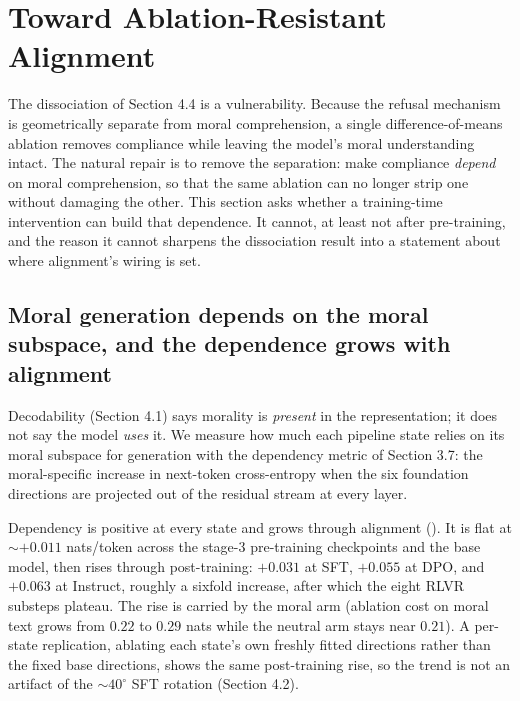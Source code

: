 \section{Toward Ablation-Resistant Alignment}\label{toward-ablation-resistant-alignment}

The dissociation of Section 4.4 is a vulnerability. Because the refusal
mechanism is geometrically separate from moral comprehension, a single
difference-of-means ablation removes compliance while leaving the model's moral
understanding intact. The natural repair is to remove the separation: make
compliance \emph{depend} on moral comprehension, so that the same ablation can no
longer strip one without damaging the other. This section asks whether a
training-time intervention can build that dependence. It cannot, at least not
after pre-training, and the reason it cannot sharpens the dissociation result
into a statement about where alignment's wiring is set.

\subsection{Moral generation depends on the moral subspace, and the dependence grows with alignment}\label{moral-generation-depends-on-the-moral-subspace-and-the-dependence-grows-with-alignment}

Decodability (Section 4.1) says morality is \emph{present} in the representation; it
does not say the model \emph{uses} it. We measure how much each pipeline state relies
on its moral subspace for generation with the dependency metric of Section 3.7:
the moral-specific increase in next-token cross-entropy when the six foundation
directions are projected out of the residual stream at every layer.

Dependency is positive at every state and grows through alignment
(). It is flat at \({\sim}{+}0.011\) nats/token across the stage-3
pre-training checkpoints and the base model, then rises through post-training:
\(+0.031\) at SFT, \(+0.055\) at DPO, and \(+0.063\) at Instruct, roughly a sixfold
increase, after which the eight RLVR substeps plateau. The rise is carried by
the moral arm (ablation cost on moral text grows from \(0.22\) to \(0.29\) nats
while the neutral arm stays near \(0.21\)). A per-state replication, ablating each
state's own freshly fitted directions rather than the fixed base directions,
shows the same post-training rise, so the trend is not an artifact of the
\({\sim}40^{\circ}\) SFT rotation (Section 4.2).

